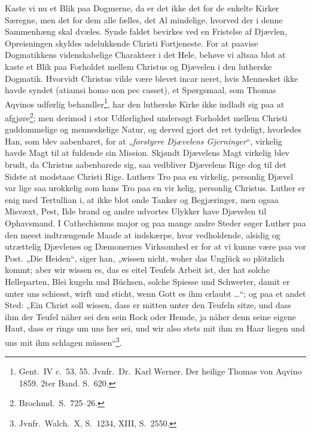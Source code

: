 \documentclass[12pt,a4paper]{article}
\newcommand{\opage}[1]{\marginnote{\footnotesize\textit{[#1]}}}
\begin{document}
Kaste vi nu et Blik paa Dogmerne, da er det ikke det for
de enkelte Kirker Særegne, men det for dem alle fælles, det Al\-%
mindelige, hvorved der i denne Sammenhæng skal dvæles. Synde\-%
faldet bevirkes ved en Fristelse af Djævlen, Opreisningen skyldes
udelukkende Christi Fortjeneste. For at paavise Dogmatikkens
videnskabelige Charakteer i det Hele, behøve vi altsaa blot at
kaste et Blik paa Forholdet mellem Christus og Djævelen i den
lutherske Dogmatik. Hvorvidt Christus vilde være blevet incar\-%
neret, hvis Mennesket ikke havde syndet (atiamsi homo non pec\-%
casset), et Spørgsmaal, som Thomas Aqvinos udførlig behandler\footnote{Gent.\ IV c.\ 53, 55. Jvnfr.\ Dr.\ Karl Werner. Der heilige Thomas von
Aqvino 1859. 2ter Band. S.\ 620.}, %
\opage{23}har den lutherske Kirke ikke indladt sig paa at afgjøre\footnote{Brochmd.\ S.\ 725--26.}; %
men
derimod i stor Udførlighed undersøgt Forholdet mellem Christi
guddommelige og menneskelige Natur, og derved gjort det ret
tydeligt, hvorledes Han, som blev aabenbaret, for at „\emph{forstyrre
Djævelens Gjerninger}“, virkelig havde Magt til at fuldende
sin Mission. Skjøndt Djævelens Magt virkelig blev brudt, da
Christus aabenbarede sig, saa vedbliver Djævelens Rige dog til det
Sidste at modstaae Christi Rige. Luthers Tro paa en virkelig,
personlig Djævel var lige saa urokkelig som hans Tro paa en vir\-%
kelig, personlig Christus. Luther er enig med Tertullian i, at ikke
blot onde Tanker og Begjæringer, men ogsaa Misvæxt, Pest, Ilde\-%
brand og andre udvortes Ulykker have Djævelen til Ophavsmand.
I Cathechismus major og paa mange andre Steder søger Luther
paa den meest indtrængende Maade at indskærpe, hvor vedholdende,
alsidig og utrættelig Djævlenes og Dæmonernes Virksomhed er for
at vi kunne være paa vor Post. „Die Heiden“, siger han, „wissen
nicht, woher das Unglück so plötzlich kommt; aber wir wissen es,
das es eitel Teufels Arbeit ist, der hat solche Helleparten, Blei\-%
kugeln und Büchsen, solche Spiesse und Schwerter, damit er unter
uns schiesst, wirft und sticht, wenn Gott es ihm erlaubt \ldots“; og
paa et andet Sted: „Ein Christ soll wissen, dass er mitten unter
den Teufeln sitze, und dass ihm der Teufel näher sei den sein
Rock oder Hemde, ja näher denn seine eigene Haut, dass er rings
um uns her sei, und wir also stets mit ihm zu Haar liegen und
uns mit ihm schlagen müssen“\footnote{Jvnfr.\ Walch.\ X, S.\ 1234, XIII, S.\ 2550.}. %
\end{document}
